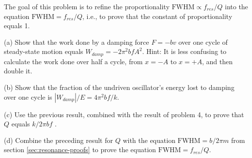 The goal of this problem is to refine the proportionality
$\text{FWHM} \propto f_{res}/Q$ into the equation $\text{FWHM}=f_{res}/Q$, i.e.,
to prove that the constant of proportionality equals 1.

(a) Show that the work done by a damping force $F=-bv$
over one cycle of steady-state motion equals $W_{damp}=-2\pi ^2bfA^2$.
 Hint: It is less confusing to calculate the
work done over half a cycle, from $x=-A$ to $x=+A$, and then double it.

(b) Show that the fraction of the undriven oscillator's
energy lost to damping over one cycle is 
$|W_{damp}|/ E=4\pi ^2bf/k$.

(c) Use the previous result, combined with the result of
problem 4, to prove that $Q$ equals $k/2\pi bf$ .

(d) Combine the preceding result for $Q$ with the equation
$\text{FWHM}=b/2\pi m$ from section \ref{sec:resonance-proofs} to prove the equation $\text{FWHM}=f_{res}/Q$.

